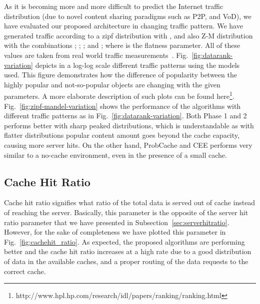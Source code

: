 \documentclass[article]{elsarticle}
\begin{document}
As it is becoming more and more difficult to predict the Internet traffic distribution (due to novel content sharing paradigms such as P2P, and VoD), we have evaluated our proposed architecture in changing traffic pattern. We have generated traffic according to a zipf distribution with , and also Z-M distribution with the combinations ; ; ; and ; where  is the flatness parameter. All of these values are taken from real world traffic measurements~\cite{hefeeda2008traffic}. Fig.~\ref{fig:datarank-variation} depicts in a log-log scale different traffic patterns using the models used. This figure demonstrates how the difference of popularity between the highly popular and not-so-popular objects are changing with the given parameters. A more elaborate description of such plots can be found here\footnote{http://www.hpl.hp.com/research/idl/papers/ranking/ranking.html}. Fig.~\ref{fig:zipf-mandel-variation} shows the performance of the algorithms with different traffic patterns as in Fig.~\ref{fig:datarank-variation}. Both Phase 1 and 2 performs better with sharp peaked distributions, which is understandable as with flatter distributions popular content amount goes beyond the cache capacity, causing more server hits. On the other hand, ProbCache and CEE performs very similar to a no-cache environment, even in the presence of a small cache. 

\subsection{Cache Hit Ratio}
Cache hit ratio signifies what ratio of the total data is served out of cache instead of reaching the server. Basically, this parameter is the opposite of the server hit ratio parameter that we have presented in Subsection~\ref{sec:serverhitratio}. However, for the sake of completeness we have plotted this parameter in Fig.~\ref{fig:cachehit_ratio}. As expected, the proposed algorithms are performing better and the cache hit ratio increases at a high rate due to a good distribution of data in the available caches, and a proper routing of the data requests to the correct cache. 
\end{document}
